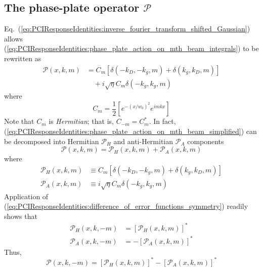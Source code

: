 \subsection{The phase-plate operator $\mathcal{P}$}
Eq.~(\ref{eq:PCIResponseIdentities:inverse_fourier_transform_shifted_Gaussian})
allows (\ref{eq:PCIResponseIdentities:phase_plate_action_on_mth_beam_integrals})
to be rewritten as
\begin{equation}
  \begin{aligned}
    \mathcal{P}(x, k, m)
    &=
    C_m
    [%
      \delta(-k_D, -k_g, m)
      +
      \delta(k_g, k_D, m)
    ]
    \\
    &\quad+
    i \sqrt{\eta} C_m \delta(-k_g, k_g, m)
  \end{aligned}
  \label{eq:PCIResponseIdentities:phase_plate_action_on_mth_beam_simplified}
\end{equation}
where
\begin{equation}
  C_m
  =
  \frac{1}{2} \left[ e^{-(x / w_0)^2} e^{i m k x} \right]
\end{equation}
Note that $C_m$ is \emph{Hermitian};
that is, $C_{-m} = C_m^*$.
In fact,
(\ref{eq:PCIResponseIdentities:phase_plate_action_on_mth_beam_simplified})
can be decomposed into Hermitian $\mathcal{P}_H$ and
anti-Hermitian $\mathcal{P}_A$ components
\begin{equation}
  \mathcal{P}(x, k, m)
  =
  \mathcal{P}_H(x, k, m)
  +
  \mathcal{P}_A(x, k, m)
  \label{eq:PCIResponseIdentities:phase_plate_action_on_mth_beam_Hermitian_decomposed}
\end{equation}
where
\begin{align}
  \mathcal{P}_H(x, k, m)
  &\equiv
  C_m
  [%
    \delta(-k_D, -k_g, m)
    +
    \delta(k_g, k_D, m)
  ]
  \label{eq:PCIResponseIdentities:phase_plate_action_on_mth_beam_Hermitian}
  \\
  \mathcal{P}_A(x, k, m)
  &\equiv
  i \sqrt{\eta} C_m \delta(-k_g, k_g, m)
  \label{eq:PCIResponseIdentities:phase_plate_action_on_mth_beam_antiHermitian}
\end{align}
Application of
(\ref{eq:PCIResponseIdentities:difference_of_error_functions_symmetry})
readily shows that
\begin{align}
  \mathcal{P}_H(x, k, -m) &= [\mathcal{P}_H(x, k, m)]^*
  \\
  \mathcal{P}_A(x, k, -m) &= -[\mathcal{P}_A(x, k, m)]^*
\end{align}
Thus,
\begin{equation}
  \mathcal{P}(x, k, -m)
  =
  [\mathcal{P}_H(x, k, m)]^*
  -
  [\mathcal{P}_A(x, k, m)]^*
  \label{eq:PCIResponseIdentities:phase_plate_action_on_mth_beam_symmetry}
\end{equation}

